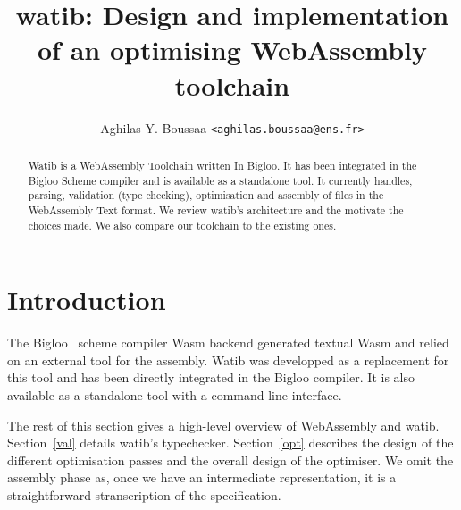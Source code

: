 \documentclass[10pt]{article}
\author{Aghilas Y. Boussaa \texttt{<aghilas.boussaa@ens.fr>}}
\title{\textsf{watib}: Design and implementation of an optimising WebAssembly
  toolchain}
\begin{document}
\maketitle
\begin{abstract}
  Watib is a WebAssembly Toolchain written In Bigloo. It has been integrated in
  the Bigloo Scheme compiler and is available as a standalone tool. It currently
  handles, parsing, validation (type checking), optimisation and assembly of
  files in the WebAssembly Text format. We review watib's architecture and the
  motivate the choices made. We also compare our toolchain to the existing ones.
\end{abstract}

\section{Introduction}
The Bigloo~\cite{Bigloo} scheme compiler Wasm backend generated textual Wasm and
relied on an external tool for the assembly. Watib was developped as a
replacement for this tool and has been directly integrated in the Bigloo
compiler. It is also available as a standalone tool with a command-line
interface.

The rest of this section gives a high-level overview of WebAssembly and watib.
Section~\ref{val} details watib's typechecker. Section~\ref{opt} describes the
design of the different optimisation passes and the overall design of the
optimiser. We omit the assembly phase as, once we have an intermediate
representation, it is a straightforward stranscription of the specification.
\end{document}
